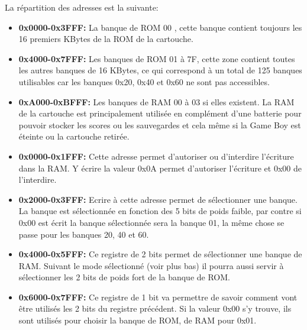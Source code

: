 \documentclass{report}
\begin{document}
La répartition des adresses est la suivante:\\
\begin{itemize}
\item \textbf{0x0000-0x3FFF:} La banque de ROM 00 , cette banque contient toujours les 16 premiers KBytes de la ROM de la cartouche.\\
\item \textbf{0x4000-0x7FFF:} Les banques de ROM 01 à 7F, cette zone contient toutes les autres banques de 16 KBytes, ce qui correspond à un total de 125 banques utilisables car les banques 0x20, 0x40 et 0x60 ne sont pas accessibles.\\
\item \textbf{0xA000-0xBFFF:} Les banques de RAM 00 à 03 si elles existent. La RAM de la cartouche est principalement utilisée en complément d'une batterie pour pouvoir stocker les scores ou les sauvegardes et cela même si la Game Boy est éteinte ou la cartouche retirée.\\
\item \textbf{0x0000-0x1FFF:} Cette adresse permet d'autoriser ou d'interdire l'écriture dans la RAM. Y écrire la valeur 0x0A permet d'autoriser l'écriture et 0x00 de l'interdire.\\
\item \textbf{0x2000-0x3FFF:} Ecrire à cette adresse permet de sélectionner une banque. La banque est sélectionnée en fonction des 5 bits de poids faible, par contre si 0x00 est écrit la banque sélectionnée sera la banque 01, la même chose se passe pour les banques 20, 40 et 60.\\
\item \textbf{0x4000-0x5FFF:} Ce registre de 2 bits permet de sélectionner une banque de RAM. Suivant le mode sélectionné (voir plus bas) il pourra aussi servir à sélectionner les 2 bits de poids fort de la banque de ROM.\\
\item \textbf{0x6000-0x7FFF:} Ce registre de 1 bit va permettre de savoir comment vont être utilisés les 2 bits du registre précédent. Si la valeur 0x00 s'y trouve, ils sont utilisés pour choisir la banque de ROM, de RAM pour 0x01.\\
\end{itemize}
\end{document}
